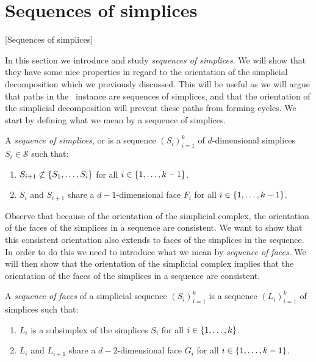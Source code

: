\section{Sequences of simplices}[Sequences of simplices]

In this section we introduce and study \emph{sequences of simplices}. We will show that they have some nice properties in regard to the orientation of the simplicial decomposition which we previously discussed. This will be useful as we will argue that paths in the \EndOfLine\ instance are sequences of simplices, and that the orientation of the simplicial decomposition will prevent these paths from forming cycles. We start by defining what we mean by a sequence of simplices.

\begin{definition}
	\label{def:sequence_of_simplices}
	A \emph{sequence of simplices}, or  is a sequence $\left(S_i\right)_{i=1}^{k}$ of $d$-dimensional simplices $S_i \in \mathcal{S}$ such that:
	\begin{enumerate}
		\item $S_{i+1} \not\subset \left\{S_1, \dots, S_i\right\}$ for all $i \in \left\{1, \dots, k-1\right\}$.
		\item $S_i$ and $S_{i+1}$ share a $d-1$-dimensional face $F_i$ for all $i \in \left\{1, \dots, k-1\right\}$.
	\end{enumerate}
\end{definition}

Observe that because of the orientation of the simplicial complex, the orientation of the faces of the simplices in a sequence are consistent. We want to show that this consistent orientation also extends to faces of the simplices in the sequence. In order to do this we need to introduce what we mean by \textit{sequence of faces}. We will then show that the orientation of the simplicial complex implies that the orientation of the faces of the simplices in a sequence are consistent.

\begin{definition}
	\label{def:sequence_of_faces}
	A \emph{sequence of faces} of a simplicial sequence $\left(S_i\right)_{i=1}^{k}$  is a sequence $\left(L_i\right)_{i=1}^{k}$ of simplices such that:
	\begin{enumerate}
		\item {} $L_i$ is a subsimplex of the simplices $S_i$ for all $i \in \left\{1, \dots, k\right\}$.
		\item $L_i$ and $L_{i+1}$ share a $d-2$-dimensional face $G_i$ for all $i \in \left\{1, \dots, k-1\right\}$.
	\end{enumerate}
\end{definition}

